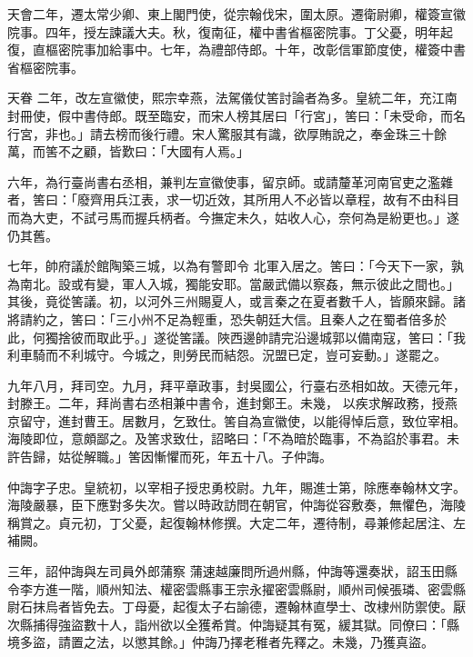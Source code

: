 \begin{pinyinscope}
 天會二年，遷太常少卿、東上閣門使，從宗翰伐宋，圍太原。遷衛尉卿，權簽宣徽院事。四年，授左諫議大夫。秋，復南征，權中書省樞密院事。丁父憂，明年起復，直樞密院事加給事中。七年，為禮部侍郎。十年，改彰信軍節度使，權簽中書省樞密院事。



 天眷
 二年，改左宣徽使，熙宗幸燕，法駕儀仗筈討論者為多。皇統二年，充江南封冊使，假中書侍郎。既至臨安，而宋人榜其居曰「行宮」，筈曰：「未受命，而名行宮，非也。」請去榜而後行禮。宋人驚服其有識，欲厚賄說之，奉金珠三十餘萬，而筈不之顧，皆歎曰：「大國有人焉。」



 六年，為行臺尚書右丞相，兼判左宣徽使事，留京師。或請釐革河南官吏之濫雜者，筈曰：「廢齊用兵江表，求一切近效，其所用人不必皆以章程，故有不由科目而為大吏，不試弓馬而握兵柄者。今撫定未久，姑收人心，奈何為是紛更也。」遂仍其舊。



 七年，帥府議於館陶築三城，以為有警即令
 北軍入居之。筈曰：「今天下一家，孰為南北。設或有變，軍人入城，獨能安耶。當嚴武備以察姦，無示彼此之間也。」其後，竟從筈議。初，以河外三州賜夏人，或言秦之在夏者數千人，皆願來歸。諸將請約之，筈曰：「三小州不足為輕重，恐失朝廷大信。且秦人之在蜀者倍多於此，何獨捨彼而取此乎。」遂從筈議。陜西邊帥請完沿邊城郭以備南寇，筈曰：「我利車騎而不利城守。今城之，則勞民而結怨。況盟已定，豈可妄動。」遂罷之。



 九年八月，拜司空。九月，拜平章政事，封吳國公，行臺右丞相如故。天德元年，封滕王。二年，拜尚書右丞相兼中書令，進封鄭王。未幾，
 以疾求解政務，授燕京留守，進封曹王。居數月，乞致仕。筈自為宣徽使，以能得悼后意，致位宰相。海陵即位，意頗鄙之。及筈求致仕，詔略曰：「不為暗於臨事，不為諂於事君。未許告歸，姑從解職。」筈因慚懼而死，年五十八。子仲誨。



 仲誨字子忠。皇統初，以宰相子授忠勇校尉。九年，賜進士第，除應奉翰林文字。海陵嚴暴，臣下應對多失次。嘗以時政訪問在朝官，仲誨從容敷奏，無懼色，海陵稱賞之。貞元初，丁父憂，起復翰林修撰。大定二年，遷待制，尋兼修起居注、左補闕。



 三年，詔仲誨與左司員外郎蒲察
 蒲速越廉問所過州縣，仲誨等還奏狀，詔玉田縣令李方進一階，順州知法、權密雲縣事王宗永擢密雲縣尉，順州司候張璘、密雲縣尉石抹烏者皆免去。丁母憂，起復太子右諭德，遷翰林直學士、改棣州防禦使。厭次縣捕得強盜數十人，詣州欲以全獲希賞。仲誨疑其有冤，緩其獄。同僚曰：「縣境多盜，請置之法，以懲其餘。」仲誨乃擇老稚者先釋之。未幾，乃獲真盜。




\end{pinyinscope}
